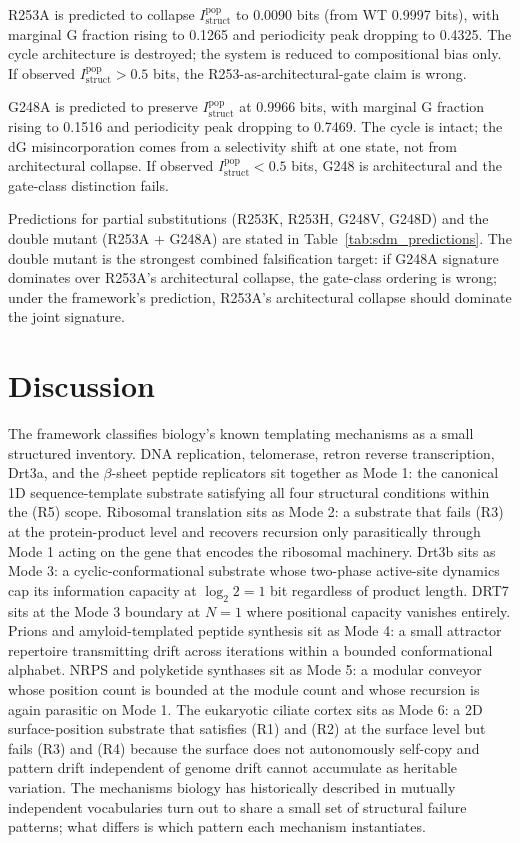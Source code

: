 \documentclass[aps,prx,reprint,amsmath,amssymb,floatfix,superscriptaddress,nofootinbib]{revtex4-2}
\theoremstyle{plain-thm}
\theoremstyle{definition-thm}
\newcommand{\Istructpop}{I_{\mathrm{struct}}^{\mathrm{pop}}}
\begin{document}
R253A is predicted to collapse $\Istructpop$ to 0.0090 bits (from WT 0.9997 bits), with marginal G fraction rising to 0.1265 and periodicity peak dropping to 0.4325. The cycle architecture is destroyed; the system is reduced to compositional bias only. If observed $\Istructpop > 0.5$ bits, the R253-as-architectural-gate claim is wrong.

G248A is predicted to preserve $\Istructpop$ at 0.9966 bits, with marginal G fraction rising to 0.1516 and periodicity peak dropping to 0.7469. The cycle is intact; the dG misincorporation comes from a selectivity shift at one state, not from architectural collapse. If observed $\Istructpop < 0.5$ bits, G248 is architectural and the gate-class distinction fails.

Predictions for partial substitutions (R253K, R253H, G248V, G248D) and the double mutant (R253A + G248A) are stated in Table~\ref{tab:sdm_predictions}. The double mutant is the strongest combined falsification target: if G248A signature dominates over R253A's architectural collapse, the gate-class ordering is wrong; under the framework's prediction, R253A's architectural collapse should dominate the joint signature.


\section{Discussion}

The framework classifies biology's known templating mechanisms as a small structured inventory. DNA replication, telomerase, retron reverse transcription, Drt3a, and the $\beta$-sheet peptide replicators \citep{Greenwald2016} sit together as Mode 1: the canonical 1D sequence-template substrate satisfying all four structural conditions within the (R5) scope. Ribosomal translation sits as Mode 2: a substrate that fails (R3) at the protein-product level and recovers recursion only parasitically through Mode 1 acting on the gene that encodes the ribosomal machinery. Drt3b sits as Mode 3: a cyclic-conformational substrate whose two-phase active-site dynamics cap its information capacity at $\log_2 2 = 1$ bit regardless of product length. DRT7 sits at the Mode 3 boundary at $N = 1$ where positional capacity vanishes entirely. Prions and amyloid-templated peptide synthesis sit as Mode 4: a small attractor repertoire transmitting drift across iterations within a bounded conformational alphabet. NRPS and polyketide synthases sit as Mode 5: a modular conveyor whose position count is bounded at the module count and whose recursion is again parasitic on Mode 1. The eukaryotic ciliate cortex sits as Mode 6: a 2D surface-position substrate that satisfies (R1) and (R2) at the surface level but fails (R3) and (R4) because the surface does not autonomously self-copy and pattern drift independent of genome drift cannot accumulate as heritable variation. The mechanisms biology has historically described in mutually independent vocabularies turn out to share a small set of structural failure patterns; what differs is which pattern each mechanism instantiates.
\end{document}
